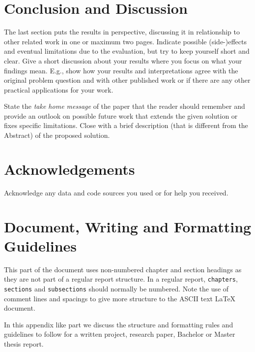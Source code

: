 \documentclass[11pt, a4paper,oneside,chapterprefix=false]{scrbook}
\begin{document}
\chapter{Conclusion and Discussion} \label{chp:conclusion}

The last section puts the results in perspective, discussing it in relationship to other related work in one or maximum two pages. Indicate possible (side-)effects and eventual limitations due to the evaluation, but try to keep yourself short and clear. Give a short discussion about your results where you focus on what your findings mean. E.g., show how your results and interpretations agree with the original problem question and with other published work or if there are any other practical applications for your work.

State the \emph{take home message} of the paper that the reader should remember and provide an outlook on possible future work that extends the given solution or fixes specific limitations. Close with a brief description (that is different from the Abstract) of the proposed solution.

\chapter{Acknowledgements} \label{chp:acknowledgements}

Acknowledge any data and code sources you used or for help you received.


\chapter*{Document, Writing and Formatting Guidelines}

This part of the document uses non-numbered chapter and section headings as they are not part of a regular report structure. In a regular report, \texttt{chapters}, \texttt{sections} and \texttt{subsections} should normally be numbered. Note the use of comment lines and spacings to give more structure to the ASCII text LaTeX document.

In this appendix like part we discuss the structure and formatting rules and guidelines to follow for a written project, research paper, Bachelor or Master thesis report.
\end{document}
